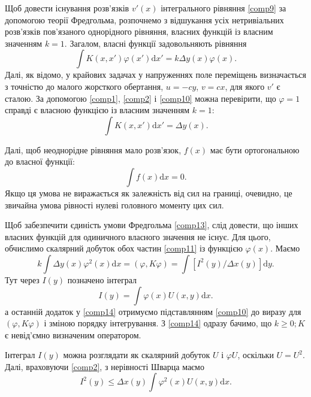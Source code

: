 \documentclass[14pt,twoside]{extreport}
\theoremstyle{mystyle}
\numberwithin{equation}{chapter}
\begin{document}
Щоб довести існування розв'язків $v'(x)$ інтегрального рівняння \eqref{comp9} за допомогою теорії Фредгольма, розпочнемо з відшукання усіх нетривіальних розв'язків пов'язаного однорідного рівняння, власних функцій із власним значенням $k=1$. Загалом, власні функції задовольняють рівняння
\begin{equation}\label{comp11}
	\displaystyle \int K(x, x')\varphi(x')\mathrm{d}x'=k\Delta y(x)\varphi(x).
\end{equation}
Далі, як відомо, у крайових задачах у напруженнях поле переміщень визначається з точністю до малого жорсткого обертання, $u=-cy$, $v=cx$, для якого $v'$ є сталою. За допомогою \eqref{comp1}, \eqref{comp2} і \eqref{comp10} можна перевірити, що $\varphi=1$ справді є власною функцією із власним значенням $k=1$:
\begin{equation}\label{comp12}
	\displaystyle \int K(x, x')\mathrm{d}x'=\Delta y(x). 
\end{equation}

Далі, щоб неоднорідне рівняння мало розв'язок, $f(x)$ має бути ортогональною до власної функції:
\begin{equation}\label{comp13}
	\displaystyle \int f(x)\mathrm{d}x=0.
\end{equation}
Якщо ця умова не виражається як залежність від сил на границі, очевидно, це звичайна умова рівності нулеві головного моменту цих сил.

Щоб забезпечити єдиність умови Фредгольма \eqref{comp13}, слід довести, що інших власних функцій для одиничного власного значення не існує. Для цього, обчислимо скалярний добуток обох частин \eqref{comp11} із функцією $\varphi(x)$. Маємо
\begin{equation}\label{comp14}
	k\displaystyle \int\Delta y(x)\varphi^{2}(x)\mathrm{d}x=(\varphi, K\varphi)=\int[I^{2}(y)/\Delta x(y)]\mathrm{d}y.
\end{equation}
Тут через $I(y)$ позначено інтеграл
\begin{equation}\label{comp15}
	I(y)=\displaystyle \int\varphi(x)U(x, y)\mathrm{d}x.
\end{equation}
а останній додаток у \eqref{comp14} отримуємо підставлянням \eqref{comp10} до виразу для $(\varphi, K\varphi)$ і зміною порядку інтегрування. З \eqref{comp14} одразу бачимо, що $k\geqslant 0;K$ є невід'ємно визначеним оператором.

Інтеграл $I(y)$ можна розглядати як скалярний добуток $U$ і $\varphi U$, оскільки $U=U^{2}$. Далі, враховуючи \eqref{comp2}, з нерівності Шварца маємо
\begin{equation}\label{comp16}
	I^{2}(y)\displaystyle \leqslant\Delta x(y)\int\varphi^{2}(x)U(x, y)\mathrm{d}x.
\end{equation}
\end{document}
